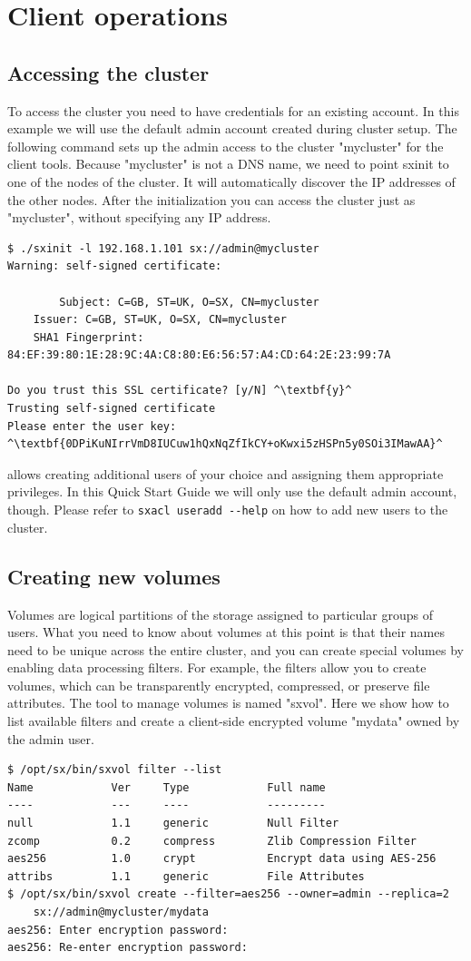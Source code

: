 \chapter{Client operations}

\section*{Accessing the cluster}
To access the cluster you need to have credentials for an existing
account. In this example we will use the default admin account created
during cluster setup. The following command sets up the admin access to
the \SX cluster "mycluster" for the client tools. Because "mycluster"
is not a DNS name, we need to point sxinit to one of the nodes of the
cluster. It will automatically discover the IP addresses of the other
nodes. After the initialization you can access the cluster just as "mycluster",
without specifying any IP address.
\small
\begin{lstlisting}
$ ./sxinit -l 192.168.1.101 sx://admin@mycluster
Warning: self-signed certificate:

        Subject: C=GB, ST=UK, O=SX, CN=mycluster
	Issuer: C=GB, ST=UK, O=SX, CN=mycluster
	SHA1 Fingerprint: 84:EF:39:80:1E:28:9C:4A:C8:80:E6:56:57:A4:CD:64:2E:23:99:7A

Do you trust this SSL certificate? [y/N] ^\textbf{y}^
Trusting self-signed certificate
Please enter the user key:
^\textbf{0DPiKuNIrrVmD8IUCuw1hQxNqZfIkCY+oKwxi5zHSPn5y0SOi3IMawAA}^
\end{lstlisting}
\LARGE
\SX allows creating additional users of your choice and assigning them
appropriate privileges. In this Quick Start Guide we will only use the
default admin account, though. Please refer to \verb+sxacl useradd --help+
on how to add new users to the cluster.

\section*{Creating new volumes}
Volumes are logical partitions of the \SX storage assigned to particular
groups of users.
What you need to know about volumes at this point is that their names
need to be unique across the entire cluster, and you can create
special volumes by enabling data processing filters. For example,
the filters allow you to create volumes, which can be transparently
encrypted, compressed, or preserve file attributes.
The tool to manage volumes is named "sxvol". Here we show how to
list available filters and create a client-side encrypted volume "mydata"
owned by the admin user.
\small
\begin{lstlisting}
$ /opt/sx/bin/sxvol filter --list
Name            Ver     Type            Full name
----            ---     ----            ---------
null            1.1     generic         Null Filter
zcomp           0.2     compress        Zlib Compression Filter
aes256          1.0     crypt           Encrypt data using AES-256
attribs         1.1     generic         File Attributes
$ /opt/sx/bin/sxvol create --filter=aes256 --owner=admin --replica=2
    sx://admin@mycluster/mydata
aes256: Enter encryption password: 
aes256: Re-enter encryption password: 
\end{lstlisting}
\LARGE

